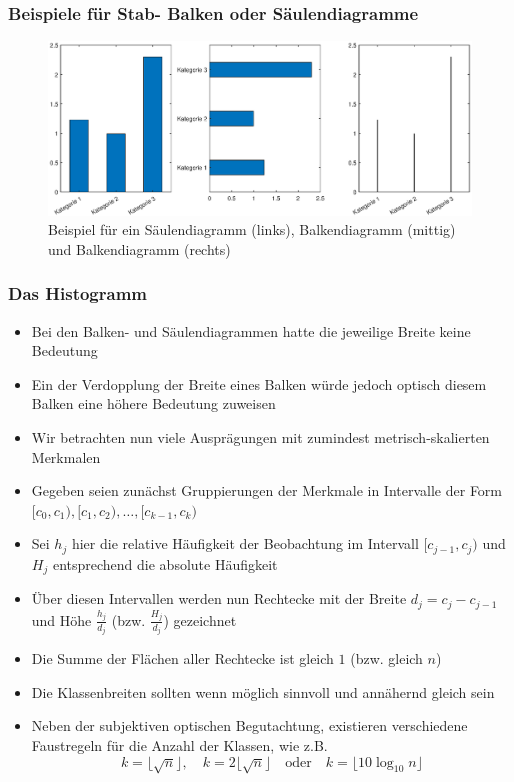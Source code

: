 \begin{frame}
\frametitle{Beispiele für Stab- Balken oder Säulendiagramme}
\begin{figure}[hbtp]
\centering
\includegraphics[scale=0.5]{images/barplot.eps}
\caption{Beispiel für ein Säulendiagramm (links), Balkendiagramm (mittig) und Balkendiagramm (rechts)}
\end{figure}
\end{frame}
\begin{frame}
\frametitle{Das Histogramm}
\begin{itemize}[<+->]
\item Bei den Balken- und Säulendiagrammen hatte die jeweilige Breite keine Bedeutung
\item Ein der Verdopplung der Breite eines Balken würde jedoch optisch diesem Balken eine höhere Bedeutung zuweisen
\item Wir betrachten nun viele Ausprägungen mit zumindest metrisch-skalierten Merkmalen
\item Gegeben seien zunächst Gruppierungen der Merkmale in Intervalle der Form $[c_0,c_1),[c_1,c_2),\ldots,[c_{k-1},c_k)$
\item Sei $h_j$ hier die relative Häufigkeit der Beobachtung im Intervall $[c_{j-1},c_j)$ und $H_j$ entsprechend die absolute Häufigkeit
\item Über diesen Intervallen werden nun Rechtecke mit der Breite $d_j=c_j-c_{j-1}$ und Höhe $\frac{h_j}{d_j}$ (bzw. $\frac{H_j}{d_j}$) gezeichnet
\item Die Summe der Flächen aller Rechtecke ist gleich $1$ (bzw. gleich $n$)
\item Die Klassenbreiten sollten wenn möglich sinnvoll und annähernd gleich sein
\item Neben der subjektiven optischen Begutachtung, existieren verschiedene Faustregeln für die Anzahl der Klassen, wie z.B.
\[
k = \lfloor\sqrt{n}\rfloor ,\quad k = 2\lfloor\sqrt{n}\rfloor  \quad\text{oder}\quad k = \lfloor 10 \log_{10} n \rfloor
\]
\end{itemize}
\end{frame}

